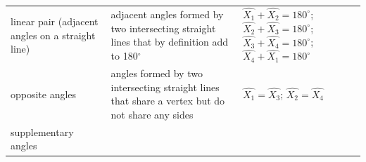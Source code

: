 {{\begin{center}
\begin{tabular}[t]{|l|l|l|}
     \tabularnewline\cline{1-1}\cline{2-2}\cline{3-3}
        linear pair (adjacent angles on a straight line) &
        adjacent angles formed by two intersecting straight lines that by definition add to 180${}^{\circ }$ &
                  $\hat{{X}_{1}}+\hat{{X}_{2}}={180}^{\circ }$;
                  $\hat{{X}_{2}}+\hat{{X}_{3}}={180}^{\circ }$;
                  $\hat{{X}_{3}}+\hat{{X}_{4}}={180}^{\circ }$;
                  $\hat{{X}_{4}}+\hat{{X}_{1}}={180}^{\circ }$
     \tabularnewline\cline{1-1}\cline{2-2}\cline{3-3}
        opposite angles &
        angles formed by two intersecting straight lines that share a vertex but do not share any sides &
                  $\hat{{X}_{1}}=\hat{{X}_{3}}$;
                  $\hat{{X}_{2}}=\hat{{X}_{4}}$
     \tabularnewline\cline{1-1}\cline{2-2}\cline{3-3}
        supplementary angles &

\end{tabular}
\end{center}}}
